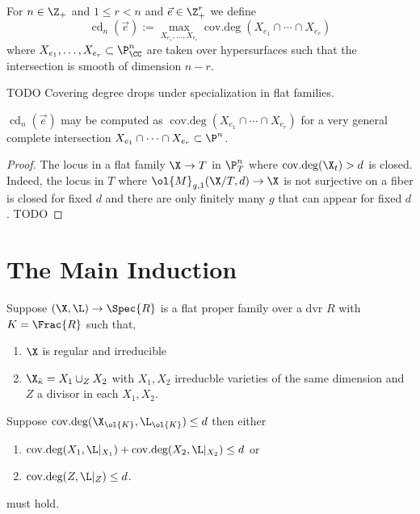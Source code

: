 \documentclass[12pt]{article}
\DeclareMathOperator{\covdeg}{\text{cov.deg}}
\DeclareMathOperator{\cd}{\text{cd}}
\begin{document}
\begin{defn}
For $n \in \Z_+$ and $1 \le r < n$ and $\vec{e} \in \Z_+^{r}$ we define
\[ \cd_n(\vec{e}) := \max_{X_{e_1}, \dots, X_{e_r}} \covdeg(X_{e_1} \cap \cdots \cap X_{e_r}) \]
where $X_{e_1}, \dots, X_{e_r} \subset \P^n_{\CC}$ are taken over hypersurfaces such that the intersection is smooth of dimension $n - r$. 
\end{defn}

\begin{lemma}
{\color{red} TODO} Covering degree drops under specialization in flat families.
\end{lemma}

\begin{cor}
$\cd_n(\vec{e})$ may be computed as $\covdeg(X_{e_1} \cap \cdots \cap X_{e_r})$ for a very general complete intersection $X_{e_1} \cap \cdots \cap X_{e_r} \subset \P^n$. 
\end{cor}

\begin{proof}
The locus in a flat family $\X \to T$ in $\P^n_T$ where $\covdeg(\X_t) > d$ is closed. Indeed, the locus in $T$ where $\ol{M}_{g,1}(\X/T, d) \to \X$ is not surjective on a fiber is closed for fixed $d$ and there are only finitely many $g$ that can appear for fixed $d$. {\color{red} TODO}
\end{proof}

\section{The Main Induction}

\begin{theorem} \label{thm:deform_and_break_degree}
Suppose $(\X, \L) \to \Spec{R}$ is a flat proper family over a dvr $R$ with $K = \Frac{R}$ such that,
\begin{enumerate}
\item $\X$ is regular and irreducible
\item $\X_{\bar{\kappa}} = X_1 \cup_Z X_2$ with $X_1, X_2$ irreducble varieties of the same dimension and $Z$ a divisor in each $X_1, X_2$.
\end{enumerate}
Suppose $\covdeg(\X_{\ol{K}}, \L_{\ol{K}}) \le d$ then either
\begin{enumerate}
\item $\covdeg(X_1, \L|_{X_1}) + \covdeg(X_2, \L|_{X_2}) \le d$ or
\item $\covdeg(Z, \L|_Z) \le d$.
\end{enumerate}
must hold.
\end{theorem}
\end{document}
